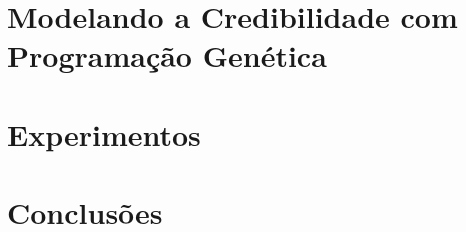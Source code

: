 \documentclass[msc]{ppgccufmg}
\begin{document}
\chapter{Modelando a Credibilidade com Programação Genética}
\label{cap::programacao_genetica}


\chapter{Experimentos}
\label{cap::experimentos}
%

\chapter{Conclusões}
\label{cap::conclusoes}
%

\end{document}
